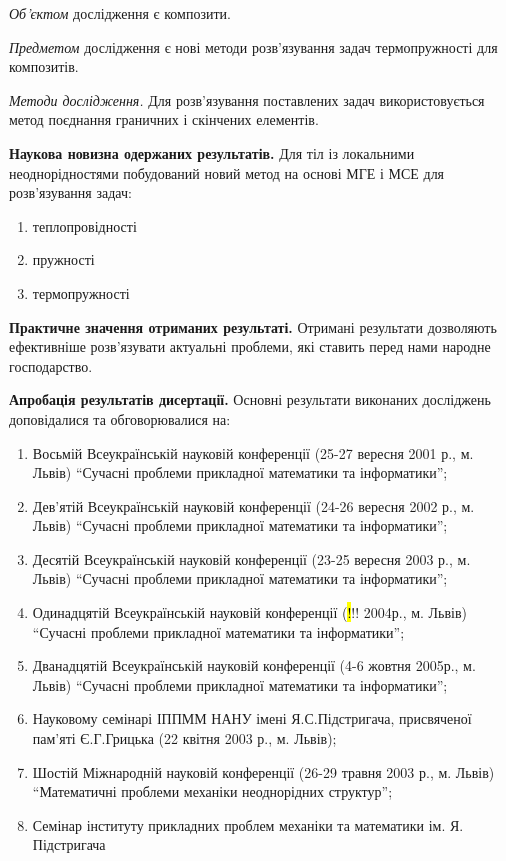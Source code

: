 \emph{Об'єктом} дослідження є композити.

\emph{Предметом} дослідження є нові методи розв'язування задач термопружності для композитів.

\emph{Методи дослідження.} Для розв'язування поставлених задач використовується метод поєднання граничних і скінчених
елементів.

\textbf{Наукова новизна одержаних результатів.} Для тіл із локальними неоднорідностями побудований новий метод на основі
МГЕ і МСЕ для розв'язування задач:

\begin{enumerate}
\def\labelenumi{\arabic{enumi}.}
\item
  теплопровідності
\item
  пружності
\item
  термопружності
\end{enumerate}

\textbf{Практичне значення отриманих результаті.} Отримані результати дозволяють ефективніше розв'язувати актуальні
проблеми, які ставить перед нами народне господарство.

\textbf{Апробація результатів дисертації.} Основні результати виконаних досліджень доповідалися та обговорювалися на:

\begin{enumerate}
\def\labelenumi{\arabic{enumi}.}
\item
  Восьмій Всеукраїнській науковій конференції (25-27 вересня 2001 р., м. Львів) ``Сучасні проблеми прикладної математики
  та інформатики'';
\item
  Дев'ятій Всеукраїнській науковій конференції (24-26 вересня 2002 р., м. Львів) ``Сучасні проблеми прикладної
  математики та інформатики'';
\item
  Десятій Всеукраїнській науковій конференції (23-25 вересня 2003 р., м. Львів) ``Сучасні проблеми прикладної математики
  та інформатики'';
\item
  Одинадцятій Всеукраїнській науковій конференції ({\hl !!! } 2004р., м. Львів) ``Сучасні проблеми прикладної
  математики та інформатики'';
\item
  Дванадцятій Всеукраїнській науковій конференції (4-6 жовтня 2005р., м. Львів) ``Сучасні проблеми прикладної математики
  та інформатики'';
\item
  Науковому семінарі ІППММ НАНУ імені Я.С.Підстригача, присвяченої пам'яті Є.Г.Грицька (22 квітня 2003 р., м. Львів);
\item
  Шостій Міжнародній науковій конференції (26-29 травня 2003 р., м. Львів) ``Математичні проблеми механіки неоднорідних
  структур'';
\item
  Семінар інституту прикладних проблем механіки та математики ім. Я. Підстригача
\end{enumerate}

